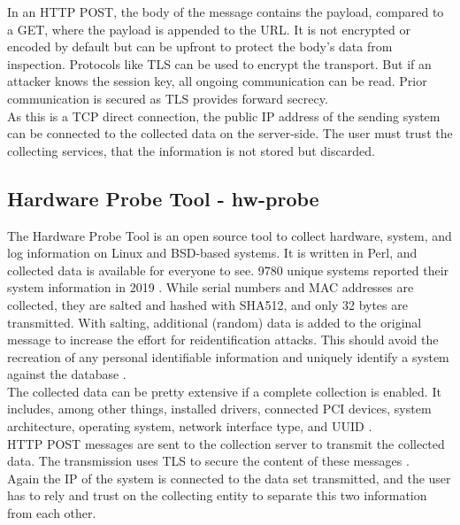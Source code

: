         In an HTTP POST, the body of the message contains the payload, compared to a GET, where the payload is appended to the URL.
        It is not encrypted or encoded by default but can be upfront to protect the body's data from inspection. Protocols like TLS can be used to encrypt the transport. But if an attacker knows the session key, all ongoing communication can be read. Prior communication is secured as TLS provides forward secrecy.\\
        
        As this is a TCP direct connection, the public IP address of the sending system can be connected to the collected data on the server-side.
        The user must trust the collecting services, that the information is not stored but discarded.\\
        
    \subsection{Hardware Probe Tool - hw-probe}
        The Hardware Probe Tool is an open source tool to collect hardware, system, and log information on Linux and BSD-based systems. It is written in Perl, and collected data is available for everyone to see. 9780 unique systems reported their system information in 2019 \cite{ponomarenko_linux_nodate}.
        While serial numbers and MAC addresses are collected, they are salted and hashed with SHA512, and only 32 bytes are transmitted. With salting, additional (random) data is added to the original message to increase the effort for reidentification attacks.
        This should avoid the recreation of any personal identifiable information and uniquely identify a system against the database  \cite{project_linuxhwhw-probe_2020}.\\
        The collected data can be pretty extensive if a complete collection is enabled. It includes, among other things, installed drivers, connected PCI devices, system architecture, operating system, network interface type, and UUID \cite{project_linuxhwhw-probe_2020}.\\
        
        HTTP POST messages are sent to the collection server to transmit the collected data. The transmission uses TLS to secure the content of these messages \cite{project_linuxhwhw-probe_2020}.\\
        Again the IP of the system is connected to the data set transmitted, and the user has to rely and trust on the collecting entity to separate this two information from each other.\\
    



